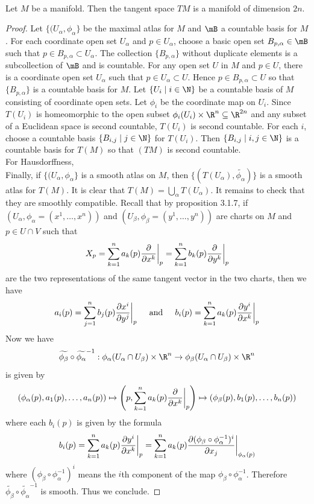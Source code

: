 \documentclass[a4paper]{article}
\begin{document}
\begin{prp}{}{}\\
Let $M$ be a manifold. Then the tangent space $TM$ is a manifold of dimension $2n$. 
\begin{proof}
Let $\{(U_\alpha,\phi_\alpha\}$ be the maximal atlas for $M$ and $\mB$ a countable basis for $M$. For each coordinate open set $U_\alpha$ and $p\in U_\alpha$, choose a basic open set $B_{p,\alpha}\in\mB$ such that $p\in B_{p,\alpha}\subset U_\alpha$. The collection $\{B_{p,\alpha}\}$ without duplicate elements is a subcollection of $\mB$ and is countable. For any open set $U$ in $M$ and $p\in U$, there is a coordinate open set $U_\alpha$ such that $p\in U_\alpha\subset U$. Hence $p\in B_{p,\alpha}\subset U$ so that $\{B_{p,\alpha}\}$ is a countable basis for $M$. Let $\{U_i\;|\;i\in\N\}$ be a countable basis of $M$ consisting of coordinate open sets. Let $\phi_i$ be the coordinate map on $U_i$. Since $T(U_i)$ is homeomorphic to the open subset $\phi_i(U_i)\times\R^n\subseteq\R^{2n}$ and any subset of a Euclidean space is second countable, $T(U_i)$ is second countable. For each $i$, choose a countable basis $\{B_{i,j}\;|\;j\in\N\}$ for $T(U_i)$. Then $\{B_{i,j}\;|\;i,j\in\N\}$ is a countable basis for $T(M)$ so that $(TM)$ is second countable. \\

For Hausdorffness,\\

Finally, if $\{(U_\alpha,\phi_\alpha\}$ is a smooth atlas on $M$, then $\{(T(U_\alpha),\widetilde{\phi_\alpha})\}$ is a smooth atlas for $T(M)$. It is clear that $T(M)=\bigcup_{\alpha}T(U_\alpha)$. It remains to check that they are smoothly compatible. Recall that by proposition 3.1.7, if $(U_\alpha,\phi_\alpha=(x^1,\dots,x^n))$ and $(U_\beta,\phi_\beta=(y^1,\dots,y^n))$ are charts on $M$ and $p\in U\cap V$ such that $$X_p=\sum_{k=1}^na_k(p)\frac{\partial}{\partial x^k}\bigg{|}_p=\sum_{k=1}^nb_k(p)\frac{\partial}{\partial y^k}\bigg{|}_p$$ are the two representations of the same tangent vector in the two charts, then we have $$a_i(p)=\sum_{j=1}^nb_j(p)\frac{\partial x^i}{\partial y^j}\bigg{|}_p\;\;\;\;\text{ and }\;\;\;\; b_i(p)=\sum_{k=1}^na_k(p)\frac{\partial y^i}{\partial x^k}\bigg{|}_p$$ Now we have $$\widetilde{\phi_\beta}\circ\widetilde{\phi_\alpha}^{-1}:\phi_\alpha(U_\alpha\cap U_\beta)\times\R^n\to\phi_\beta(U_\alpha\cap U_\beta)\times\R^n$$ is given by $$(\phi_\alpha(p),a_1(p),\dots,a_n(p))\mapsto\left(p,\sum_{k=1}^na_k(p)\frac{\partial}{\partial x^k}\bigg{|}_p\right)\mapsto(\phi_\beta(p),b_1(p),\dots,b_n(p))$$ where each $b_i(p)$ is given by the formula $$b_i(p)=\sum_{k=1}^na_k(p)\frac{\partial y^i}{\partial x^k}\bigg{|}_p=\sum_{k=1}^na_k(p)\frac{\partial(\phi_\beta\circ\phi_\alpha^{-1})^i}{\partial x_j}\bigg{|}_{\phi_\alpha(p)}$$ where $(\phi_\beta\circ\phi_\alpha^{-1})^i$ means the $i$th component of the map $\phi_\beta\circ\phi_\alpha^{-1}$. Therefore $\widetilde{\phi_\beta}\circ\widetilde{\phi_\alpha}^{-1}$ is smooth. Thus we conclude. 
\end{proof}
\end{prp}
\end{document}
